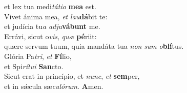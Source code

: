 \evenverse et lex tua medi\textit{tá}\textit{ti}\textit{o} \textbf{me}\textbf{a} est.\\
\oddverse Vivet ánima mea, \textit{et} \textit{lau}\textbf{dá}bit te:~\*\\
\oddverse et judícia tu\textit{a} \textit{ad}\textit{ju}\textbf{vá}\textbf{bunt} me.\\
\evenverse Errávi, sicut o\textit{vis}, \textit{quæ} \textbf{pé}riit:~\*\\
\evenverse quære servum tuum, quia mandáta tua \textit{non} \textit{sum} \textit{o}\textbf{blí}tus.\\
\oddverse Glória Pa\textit{tri}, \textit{et} \textbf{Fí}lio,~\*\\
\oddverse et Spi\textit{rí}\textit{tu}\textit{i} \textbf{San}cto.\\
\evenverse Sicut erat in princípio, et \textit{nunc}, \textit{et} \textbf{sem}per,~\*\\
\evenverse et in sǽcula sæ\textit{cu}\textit{ló}\textit{rum}. \textbf{A}men.\\
